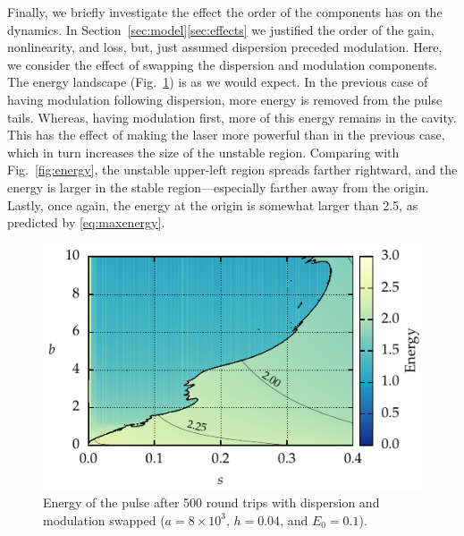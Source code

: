 \documentclass[9pt,twocolumn,twoside]{osajnl}
\begin{document}
Finally, we briefly investigate the effect the order of the components has on the dynamics. In Section~\ref{sec:model}\ref{sec:effects} we justified the order of the gain, nonlinearity, and loss, but, just assumed dispersion preceded modulation. Here, we consider the effect of swapping the dispersion and modulation components. The energy landscape (Fig.~\ref{fig:energyswitch}) is as we would expect. In the previous case of having modulation following dispersion, more energy is removed from the pulse tails. Whereas, having modulation first, more of this energy remains in the cavity. This has the effect of making the laser more powerful than in the previous case, which in turn increases the size of the unstable region. Comparing with Fig.~\ref{fig:energy}, the unstable upper-left region spreads farther rightward, and the energy is larger in the stable region---especially farther away from the origin. Lastly, once again, the energy at the origin is somewhat larger than 2.5, as predicted by \eqref{eq:maxenergy}.

\begin{figure}[tbp]
	\centering
	\includegraphics{Figures/ParamSpaceEnergySwitch}
	\caption{Energy of the pulse after 500 round trips with dispersion and modulation swapped ($a = 8 \times 10^3$, $h = 0.04$, and $E_0 = 0.1$).}
	\label{fig:energyswitch}
\end{figure}
\end{document}
